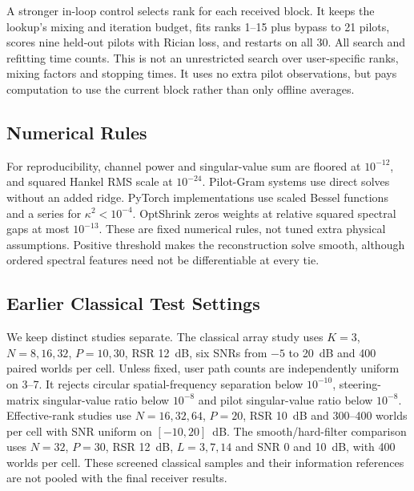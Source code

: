 A stronger in-loop control selects rank for each received block. It keeps the lookup's mixing and iteration budget, fits ranks 1--15 plus bypass to 21 pilots, scores nine held-out pilots with Rician loss, and restarts on all 30. All search and refitting time counts. This is not an unrestricted search over user-specific ranks, mixing factors and stopping times. It uses no extra pilot observations, but pays computation to use the current block rather than only offline averages.


\subsection{Numerical Rules}
For reproducibility, channel power and singular-value sum are floored at $10^{-12}$, and squared Hankel RMS scale at $10^{-24}$. Pilot-Gram systems use direct solves without an added ridge. PyTorch implementations use scaled Bessel functions and a series for $\kappa^2<10^{-4}$. OptShrink zeros weights at relative squared spectral gaps at most $10^{-13}$. These are fixed numerical rules, not tuned extra physical assumptions. Positive threshold makes the reconstruction solve smooth, although ordered spectral features need not be differentiable at every tie.


\subsection{Earlier Classical Test Settings}
We keep distinct studies separate. The classical array study uses $K=3$, $N=8,16,32$, $P=10,30$, RSR 12~dB, six SNRs from $-5$ to 20~dB and 400 paired worlds per cell. Unless fixed, user path counts are independently uniform on 3--7. It rejects circular spatial-frequency separation below $10^{-10}$, steering-matrix singular-value ratio below $10^{-8}$ and pilot singular-value ratio below $10^{-8}$. Effective-rank studies use $N=16,32,64$, $P=20$, RSR 10~dB and 300--400 worlds per cell with SNR uniform on $[-10,20]$~dB. The smooth/hard-filter comparison uses $N=32$, $P=30$, RSR 12~dB, $L=3,7,14$ and SNR 0 and 10~dB, with 400 worlds per cell. These screened classical samples and their information references are not pooled with the final receiver results.


